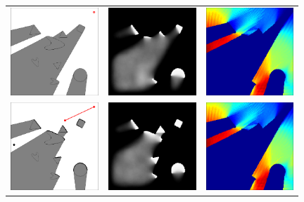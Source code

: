 \begin{figure}
\centering
 \begin{tabular}{ccc}
\includegraphics[width=1.3in]{2D/scene_01}&
\includegraphics[width=1.3in]{2D/marginal_01}&
\includegraphics[width=1.3in]{2D/energy_01}\\
\includegraphics[width=1.3in]{2D/scene_02}&
\includegraphics[width=1.3in]{2D/marginal_02}&
\includegraphics[width=1.3in]{2D/energy_01}\\

\end{tabular}
\end{figure}
